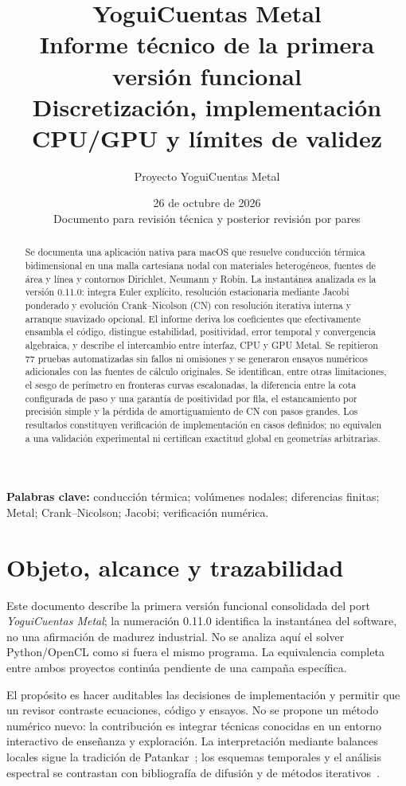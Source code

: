 \documentclass[11pt,a4paper]{article}
\title{YoguiCuentas Metal\\[3mm]\large Informe técnico de la primera versión funcional\\
Discretización, implementación CPU/GPU y límites de validez}
\author{Proyecto YoguiCuentas Metal}
\date{26 de octubre de 2026\\\small Documento para revisión técnica y posterior revisión por pares}
\begin{document}
\maketitle
\begin{abstract}
Se documenta una aplicación nativa para macOS que resuelve conducción térmica
bidimensional en una malla cartesiana nodal con materiales heterogéneos,
fuentes de área y línea y contornos Dirichlet, Neumann y Robin. La instantánea
analizada es la versión 0.11.0: integra Euler explícito, resolución estacionaria
mediante Jacobi ponderado y evolución Crank--Nicolson (CN) con resolución
iterativa interna y arranque suavizado opcional. El informe deriva los
coeficientes que efectivamente ensambla el código, distingue estabilidad,
positividad, error temporal y convergencia algebraica, y describe el intercambio
entre interfaz, CPU y GPU Metal. Se repitieron 77 pruebas automatizadas sin
fallos ni omisiones y se generaron ensayos numéricos adicionales con las
fuentes de cálculo originales. Se identifican, entre otras limitaciones, el
sesgo de perímetro en fronteras curvas escalonadas, la diferencia entre la cota
configurada de paso y una garantía de positividad por fila, el estancamiento por
precisión simple y la pérdida de amortiguamiento de CN con pasos grandes.
Los resultados constituyen verificación de implementación en casos definidos;
no equivalen a una validación experimental ni certifican exactitud global en
geometrías arbitrarias.
\end{abstract}
\textbf{Palabras clave:} conducción térmica; volúmenes nodales; diferencias
finitas; Metal; Crank--Nicolson; Jacobi; verificación numérica.
\tableofcontents
\clearpage

\section{Objeto, alcance y trazabilidad}
\label{sec:scope}
Este documento describe la primera versión funcional consolidada del port
\emph{YoguiCuentas Metal}; la numeración 0.11.0 identifica la instantánea del
software, no una afirmación de madurez industrial. No se analiza aquí el
solver Python/OpenCL como si fuera el mismo programa. La equivalencia completa
entre ambos proyectos continúa pendiente de una campaña específica.

El propósito es hacer auditables las decisiones de implementación y permitir
que un revisor contraste ecuaciones, código y ensayos. No se propone un método
numérico nuevo: la contribución es integrar técnicas conocidas en un entorno
interactivo de enseñanza y exploración. La interpretación mediante balances
locales sigue la tradición de Patankar~\cite{patankar}; los esquemas temporales
y el análisis espectral se contrastan con bibliografía de difusión y de
métodos iterativos~\cite{langtangen,templates,petsc}.
\end{document}
